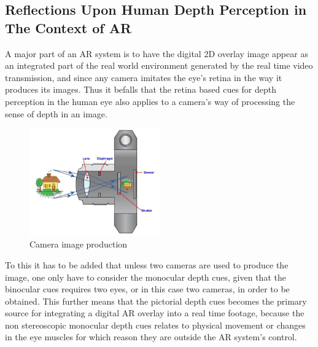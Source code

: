 \subsection{Reflections Upon Human Depth Perception in The Context of AR}
A major part of an AR system is to have the digital 2D overlay image appear as an integrated part of the real world environment generated by the real time video transmission, and since any camera imitates the eye’s retina in the way it produces its images. Thus it befalls that the retina based cues for depth perception in the human eye also applies to a camera’s way of processing the sense of depth in an image.

\begin{figure}[h!]
   \centering
   \includegraphics[width=0.5\textwidth]{figures/camera.jpg}
   \caption{Camera image production \cite{Camera}}\label{fig:camera}
\end{figure}

To this it has to be added that unless two cameras are used to produce the image, one only have to consider the monocular depth cues, given that the binocular cues requires two eyes, or in this case two cameras, in order to be obtained. This further means that the pictorial depth cues becomes the primary source for integrating a digital AR overlay into a real time footage, because the non stereoscopic monocular depth cues relates to physical movement or changes in the eye muscles for which reason they are outside the AR system’s control.

